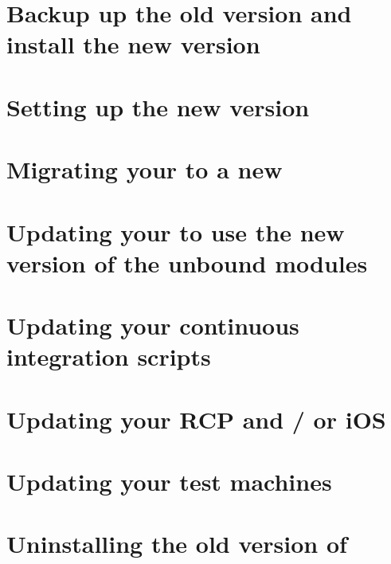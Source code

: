\section{Backup up the old version and install the new version}


\section{Setting up the new version}


\section{Migrating your \gdprojects{} to a new \gddb{}}


\section{Updating your \gdprojects{} to use the new version of the unbound modules}


\section{Updating your continuous integration scripts}


\section{Updating your RCP and / or iOS \gdauts{}}


\section{Updating your test machines}


\section{Uninstalling the old version of \app{}}

